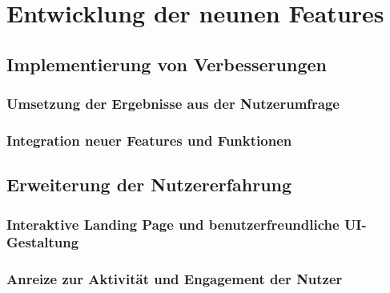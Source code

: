 
\chapter{Entwicklung der neunen Features}
\label{chapter:6}


\section{Implementierung von Verbesserungen }

\subsection{Umsetzung der Ergebnisse aus der Nutzerumfrage}

\subsection{Integration neuer Features und Funktionen}

\section{Erweiterung der Nutzererfahrung}

\subsection{Interaktive Landing Page und benutzerfreundliche UI-Gestaltung}

\subsection{Anreize zur Aktivität und Engagement der Nutzer}

